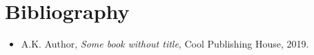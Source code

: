 \newpage
\chapter*{Bibliography}

\begin{itemize}
	\item A.K. Author, \emph{Some book without title}, Cool Publishing House, 2019.

\end{itemize}
	

